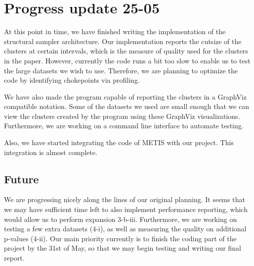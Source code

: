 \documentclass[a4paper,11pt]{article}
\begin{document}
\pagebreak
\section{Progress update 25-05}
At this point in time, we have finished writing the implementation of the structural sampler architecture. Our implementation reports the cutsize of the clusters at certain intervals, which is the measure of quality used for the clusters in the paper. However, currently the code runs a bit too slow to enable us to test the large datasets we wish to use. Therefore, we are planning to optimize the code by identifying chokepoints via profiling. 

We have also made the program capable of reporting the clusters in a GraphViz compatible notation. Some of the datasets we used are small enough that we can view the clusters created by the program using these GraphViz visualizations. Furthermore, we are working on a command line interface to automate testing.

Also, we have started integrating the code of METIS with our project. This integration is almost complete.

\subsection{Future}
We are progressing nicely along the lines of our original planning. It seems that we may have sufficient time left to also implement performance reporting, which would allow us to perform expansion 3-b-iii. Furthermore, we are working on testing a few extra datasets (4-i), as well as measuring the quality on additional p-values (4-ii). Our main priority currently is to finish the coding part of the project by the 31st of May, so that we may begin testing and writing our final report.
\end{document}
